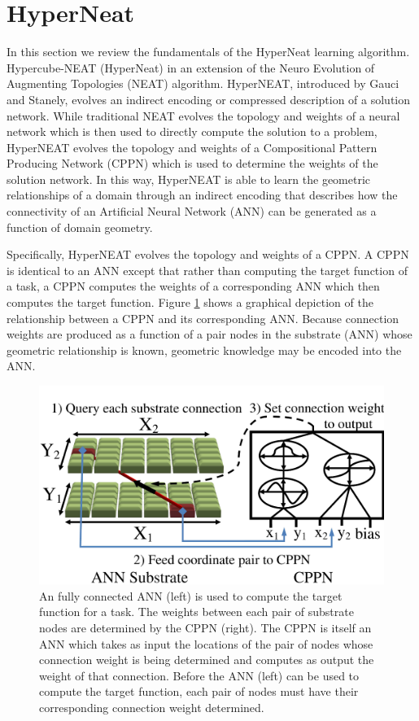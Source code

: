 \documentclass{acm_proc_article-sp}
\begin{document}
\section{HyperNeat}
\label{sec:hyperneat}
In this section we review the fundamentals of the HyperNeat learning algorithm. Hypercube-NEAT (HyperNeat) in an extension of the Neuro Evolution of Augmenting Topologies (NEAT) algorithm\cite{stanley02}. HyperNEAT, introduced by Gauci and Stanely\cite{gauci08}, evolves an indirect encoding or compressed description of a solution network. While traditional NEAT evolves the topology and weights of a neural network which is then used to directly compute the solution to a problem, HyperNEAT evolves the topology and weights of a Compositional Pattern Producing Network (CPPN) which is used to determine the weights of the solution network. In this way, HyperNEAT is able to learn the geometric relationships of a domain through an indirect encoding that describes how the connectivity of an Artificial Neural Network (ANN) can be generated as a function of domain geometry. 

Specifically, HyperNEAT evolves the topology and weights of a CPPN. A CPPN is identical to an ANN except that rather than computing the target function of a task, a CPPN computes the weights of a corresponding ANN which then computes the target function. Figure \ref{fig:cppn} shows a graphical depiction of the relationship between a CPPN and its corresponding ANN. Because connection weights are produced as a function of a pair nodes in the substrate (ANN) whose geometric relationship is known, geometric knowledge may be encoded into the ANN. 

\begin{figure}[htp]
\begin{center}
\includegraphics[width=\columnwidth]{figures/cppn}
\end{center}
\caption{An fully connected ANN (left) is used to compute the target function for a task. The weights between each pair of substrate nodes are determined by the CPPN (right). The CPPN is itself an ANN which takes as input the locations of the pair of nodes whose connection weight is being determined and computes as output the weight of that connection. Before the ANN (left) can be used to compute the target function, each pair of nodes must have their corresponding connection weight determined.}
\label{fig:cppn}
\end{figure}
\end{document}
